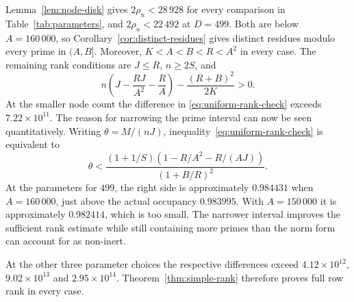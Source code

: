 Lemma~\ref{lem:node-disk} gives $2\rho_n<28\,928$ for every comparison
in Table~\ref{tab:parameters}, and $2\rho_n<22\,492$ at $D=499$.
Both are below $A=160\,000$, so Corollary~\ref{cor:distinct-residues}
gives distinct residues modulo every prime in $(A,B]$. Moreover,
$K<A<B<R<A^2$ in every case. The remaining rank conditions are
$J\leq R$, $n\geq2S$, and
\begin{equation}\label{eq:uniform-rank-check}
 n\left(J-\frac{RJ}{A^2}-\frac RA\right)-\frac{(R+B)^2}{2K}>0.
\end{equation}
At the smaller node count the difference in \eqref{eq:uniform-rank-check}
exceeds $7.22\times10^{11}$.
The reason for narrowing the prime interval can now be seen quantitatively.
Writing $\theta=M/(nJ)$, inequality~\eqref{eq:uniform-rank-check} is equivalent to
\[
 \theta<\frac{(1+1/S)(1-R/A^2-R/(AJ))}{(1+B/R)^2}.
\]
At the parameters for $499$, the right side is approximately $0.984431$
when $A=160\,000$, just above the actual occupancy $0.983995$. With
$A=150\,000$ it is approximately $0.982414$, which is too small.
The narrower interval improves the sufficient rank estimate while still
containing more primes than the norm form can account for as non-inert.

At the other three parameter choices the respective differences exceed
$4.12\times10^{12}$, $9.02\times10^{13}$ and $2.95\times10^{14}$.
Theorem~\ref{thm:simple-rank} therefore proves full row rank in every case.

